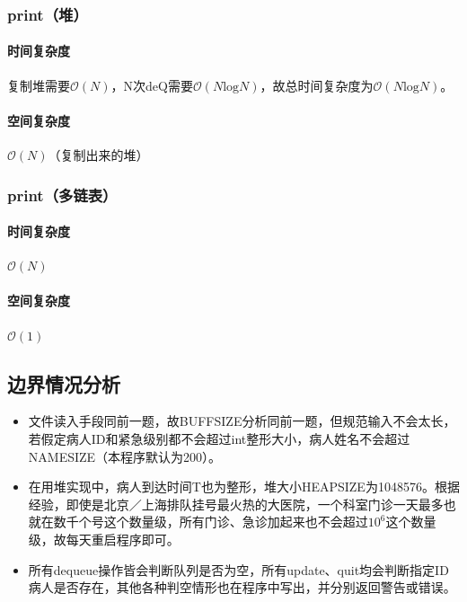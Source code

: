 \documentclass{homework}
\begin{document}
    \subsubsection{print（堆）}
    \paragraph{时间复杂度}复制堆需要$\mathcal{O}(N)$，N次deQ需要$\mathcal{O}(N\mathrm{log}N)$，故总时间复杂度为$\mathcal{O}(N\mathrm{log}N)$。
    \paragraph{空间复杂度}$\mathcal{O}(N)$（复制出来的堆）
    \subsubsection{print（多链表）}
    \paragraph{时间复杂度}$\mathcal{O}(N)$
    \paragraph{空间复杂度}$\mathcal{O}(1)$
\subsection{边界情况分析}
\begin{itemize}
    \item 文件读入手段同前一题，故BUFFSIZE分析同前一题，但规范输入不会太长，若假定病人ID和紧急级别都不会超过int整形大小，病人姓名不会超过NAMESIZE（本程序默认为200）。
    \item 在用堆实现中，病人到达时间T也为整形，堆大小HEAPSIZE为1048576。根据经验，即使是北京／上海排队挂号最火热的大医院，一个科室门诊一天最多也就在数千个号这个数量级，所有门诊、急诊加起来也不会超过$10^6$这个数量级，故每天重启程序即可。
    \item 所有dequeue操作皆会判断队列是否为空，所有update、quit均会判断指定ID病人是否存在，其他各种判空情形也在程序中写出，并分别返回警告或错误。
\end{itemize}
\end{document}
